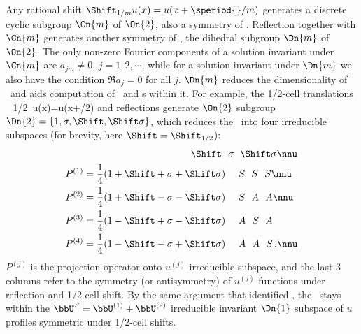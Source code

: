 Any rational shift $ \Shift_{1/m}u(x)=u(x+\speriod{}/m)$ generates a discrete
cyclic subgroup $\Cn{m}$ of $\On{2}$, also a symmetry of \KSe.
Reflection together with $\Cn{m}$ generates another
symmetry of \KSe, the dihedral subgroup $\Dn{m}$ of $\On{2}$.
The only non-zero Fourier components of a solution invariant
under $\Cn{m}$ are $a_{jm} \neq 0$, $j =1,2,\cdots$, while for a
solution invariant under $\Dn{m}$ we also have the condition
$\Re a_j=0$ for all $j$.
$\Dn{m}$ reduces the dimensionality of \statesp\ and aids computation of
\eqva\ and \po s within it. For example, the 1/2-cell translations \beq
    \Shift_{1/2}\, u(x)=u(x+\speriod{}/2)
and reflections generate $\On{2}$
subgroup $\Dn{2} = \{1, \Refl,\Shift,\Shift\Refl\}$,
which
reduces the \statesp\ into four irreducible subspaces
(for brevity, here $\Shift = \Shift_{1/2}$):
\begin{align}
 & \qquad\qquad\qquad\qquad\qquad
              ~~~ \Shift ~~ \Refl  ~\;  \Shift\Refl
    \nnu\\
P^{(1)} &= \frac{1}{4} (1 + \Shift + \Refl + \Shift\Refl)
           ~~~~  S  ~~  S   ~~   S
    \nnu\\
P^{(2)} &= \frac{1}{4} (1 + \Shift - \Refl - \Shift\Refl)
            ~~~~  S  ~~  A   ~~   A
    \nnu\\
P^{(3)} &= \frac{1}{4} (1 - \Shift + \Refl - \Shift\Refl)
           ~~~~  A  ~~  S   ~~   A
     \label{ek_defn}\\
P^{(4)} &= \frac{1}{4} (1 - \Shift - \Refl + \Shift\Refl)
          ~~~~  A  ~~  A   ~~   S
\,.
    \nnu
\end{align}
$P^{(j)}$ is the projection operator onto
$u^{(j)}$ irreducible subspace, and the last 3 columns
refer to the symmetry (or antisymmetry) of
$u^{(j)}$ functions under reflection and
1/2-cell shift.
By the same argument that identified ,
the \KSf\
stays within the
 $\bbU^S =  \bbU^{(1)}+ \bbU^{(2)}$
irreducible invariant $\Dn{1}$ subspace  of
$u$ profiles symmetric under 1/2-cell shifts.

